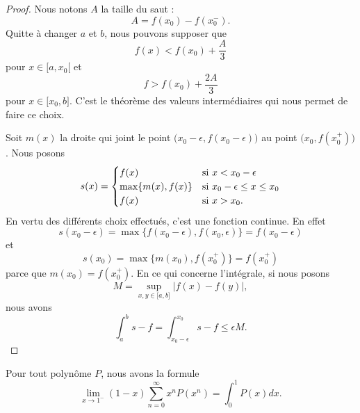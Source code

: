 \begin{proof}
    Nous notons \( A\) la taille du saut :
    \begin{equation}
        A=f(x_0)-f(x_0^-).
    \end{equation}
    Quitte à changer \( a\) et \( b\), nous pouvons supposer que
    \begin{equation}
        f(x)<f(x_0)+\frac{ A }{ 3 }
    \end{equation}
    pour \( x\in \mathopen[ a , x_0 [\) et 
    \begin{equation}
        f>f(x_0)+\frac{ 2A }{ 3 }
    \end{equation}
    pour \( x\in \mathopen[ x_0 , b \mathclose]\). C'est le théorème des valeurs intermédiaires qui nous permet de faire ce choix.

    Soit \( m(x)\) la droite qui joint le point \( \big( x_0-\epsilon, f(x_0-\epsilon) \big)\) au point \( \big( x_0,f(x_0^+) \big)\). Nous posons
    \begin{equation}
        s(x)=\begin{cases}
            f(x)    &   \text{si \( x<x_0-\epsilon\)}\\
            \max\{ m(x),f(x) \}    &   \text{si \( x_0-\epsilon\leq x\leq x_0\)}\\
            f(x)    &    \text{si $x>x_0$}.
        \end{cases}
    \end{equation}
    En vertu des différents choix effectués, c'est une fonction continue. En effet
    \begin{equation}
        s(x_0-\epsilon)=\max\{ f(x_0-\epsilon),f(x_0,\epsilon) \}=f(x_0-\epsilon)
    \end{equation}
    et 
    \begin{equation}
        s(x_0)=\max\{ m(x_0),f(x_0^+) \}=f(x_0^+)
    \end{equation}
    parce que \( m(x_0)=f(x_0^+)\). En ce qui concerne l'intégrale, si nous posons
    \begin{equation}
        M=\sup_{x,y\in \mathopen[ a , b \mathclose]}| f(x)-f(y) |,
    \end{equation}
    nous avons
    \begin{equation}
        \int_a^bs-f=\int_{x_0-\epsilon}^{x_0}s-f\leq \epsilon M.
    \end{equation}
\end{proof}

\begin{lemma}\label{LemauxrKN}
    Pour tout polynôme \( P\), nous avons la formule
    \begin{equation}
        \lim_{x\to 1^-} (1-x)\sum_{n=0}^{\infty}x^nP(x^n)=\int_0^1P(x)dx.
    \end{equation}
\end{lemma}

